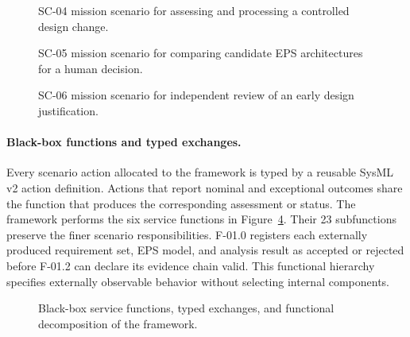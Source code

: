 \documentclass[11pt,a4paper]{article}
\begin{document}
\begin{figure}[H]
    \centering
    \resizebox{\linewidth}{!}{}
    \caption{SC-04 mission scenario for assessing and processing a controlled design change.}
    \label{fig:scenario-assess-change}
\end{figure}

\begin{figure}[H]
    \centering
    \resizebox{\linewidth}{!}{}
    \caption{SC-05 mission scenario for comparing candidate EPS architectures for a human decision.}
    \label{fig:scenario-compare-eps-architectures}
\end{figure}

\begin{figure}[H]
    \centering
    \resizebox{\linewidth}{!}{}
    \caption{SC-06 mission scenario for independent review of an early design justification.}
    \label{fig:scenario-review-justification}
\end{figure}

\paragraph{Black-box functions and typed exchanges.}
Every scenario action allocated to the framework is typed by a reusable SysML v2 action definition. Actions that report nominal and exceptional outcomes share the function that produces the corresponding assessment or status. The framework performs the six service functions in Figure~\ref{fig:framework-black-box-functions}. Their 23 subfunctions preserve the finer scenario responsibilities. F-01.0 registers each externally produced requirement set, EPS model, and analysis result as accepted or rejected before F-01.2 can declare its evidence chain valid. This functional hierarchy specifies externally observable behavior without selecting internal components.

\begin{figure}[H]
    \centering
    \resizebox{\linewidth}{!}{}
    \caption{Black-box service functions, typed exchanges, and functional decomposition of the framework.}
    \label{fig:framework-black-box-functions}
\end{figure}
\end{document}
